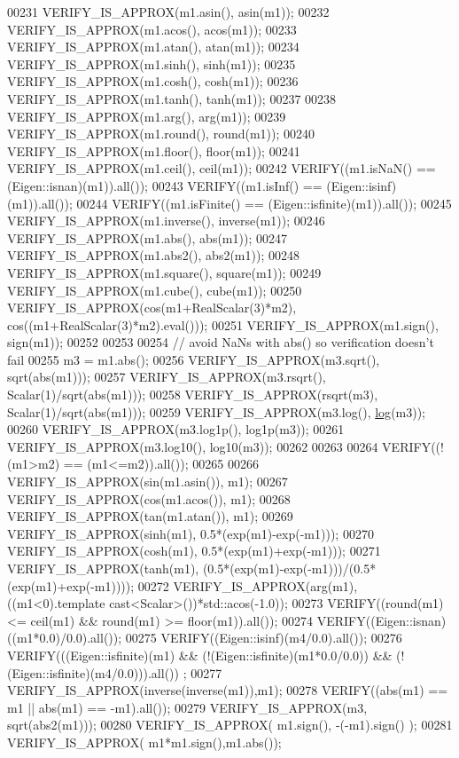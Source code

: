 \begin{DoxyCode}
00231   VERIFY\_IS\_APPROX(m1.asin(), asin(m1));
00232   VERIFY\_IS\_APPROX(m1.acos(), acos(m1));
00233   VERIFY\_IS\_APPROX(m1.atan(), atan(m1));
00234   VERIFY\_IS\_APPROX(m1.sinh(), sinh(m1));
00235   VERIFY\_IS\_APPROX(m1.cosh(), cosh(m1));
00236   VERIFY\_IS\_APPROX(m1.tanh(), tanh(m1));
00237 
00238   VERIFY\_IS\_APPROX(m1.arg(), arg(m1));
00239   VERIFY\_IS\_APPROX(m1.round(), round(m1));
00240   VERIFY\_IS\_APPROX(m1.floor(), floor(m1));
00241   VERIFY\_IS\_APPROX(m1.ceil(), ceil(m1));
00242   VERIFY((m1.isNaN() == (Eigen::isnan)(m1)).all());
00243   VERIFY((m1.isInf() == (Eigen::isinf)(m1)).all());
00244   VERIFY((m1.isFinite() == (Eigen::isfinite)(m1)).all());
00245   VERIFY\_IS\_APPROX(m1.inverse(), inverse(m1));
00246   VERIFY\_IS\_APPROX(m1.abs(), abs(m1));
00247   VERIFY\_IS\_APPROX(m1.abs2(), abs2(m1));
00248   VERIFY\_IS\_APPROX(m1.square(), square(m1));
00249   VERIFY\_IS\_APPROX(m1.cube(), cube(m1));
00250   VERIFY\_IS\_APPROX(cos(m1+RealScalar(3)*m2), cos((m1+RealScalar(3)*m2).eval()));
00251   VERIFY\_IS\_APPROX(m1.sign(), sign(m1));
00252 
00253 
00254   \textcolor{comment}{// avoid NaNs with abs() so verification doesn't fail}
00255   m3 = m1.abs();
00256   VERIFY\_IS\_APPROX(m3.sqrt(), sqrt(abs(m1)));
00257   VERIFY\_IS\_APPROX(m3.rsqrt(), Scalar(1)/sqrt(abs(m1)));
00258   VERIFY\_IS\_APPROX(rsqrt(m3), Scalar(1)/sqrt(abs(m1)));
00259   VERIFY\_IS\_APPROX(m3.log(), \hyperlink{structlog}{log}(m3));
00260   VERIFY\_IS\_APPROX(m3.log1p(), log1p(m3));
00261   VERIFY\_IS\_APPROX(m3.log10(), log10(m3));
00262 
00263 
00264   VERIFY((!(m1>m2) == (m1<=m2)).all());
00265 
00266   VERIFY\_IS\_APPROX(sin(m1.asin()), m1);
00267   VERIFY\_IS\_APPROX(cos(m1.acos()), m1);
00268   VERIFY\_IS\_APPROX(tan(m1.atan()), m1);
00269   VERIFY\_IS\_APPROX(sinh(m1), 0.5*(exp(m1)-exp(-m1)));
00270   VERIFY\_IS\_APPROX(cosh(m1), 0.5*(exp(m1)+exp(-m1)));
00271   VERIFY\_IS\_APPROX(tanh(m1), (0.5*(exp(m1)-exp(-m1)))/(0.5*(exp(m1)+exp(-m1))));
00272   VERIFY\_IS\_APPROX(arg(m1), ((m1<0).\textcolor{keyword}{template} cast<Scalar>())*std::acos(-1.0));
00273   VERIFY((round(m1) <= ceil(m1) && round(m1) >= floor(m1)).all());
00274   VERIFY((Eigen::isnan)((m1*0.0)/0.0).all());
00275   VERIFY((Eigen::isinf)(m4/0.0).all());
00276   VERIFY(((Eigen::isfinite)(m1) && (!(Eigen::isfinite)(m1*0.0/0.0)) && (!(Eigen::isfinite)(m4/0.0))).all())
      ;
00277   VERIFY\_IS\_APPROX(inverse(inverse(m1)),m1);
00278   VERIFY((abs(m1) == m1 || abs(m1) == -m1).all());
00279   VERIFY\_IS\_APPROX(m3, sqrt(abs2(m1)));
00280   VERIFY\_IS\_APPROX( m1.sign(), -(-m1).sign() );
00281   VERIFY\_IS\_APPROX( m1*m1.sign(),m1.abs());

\end{DoxyCode}
